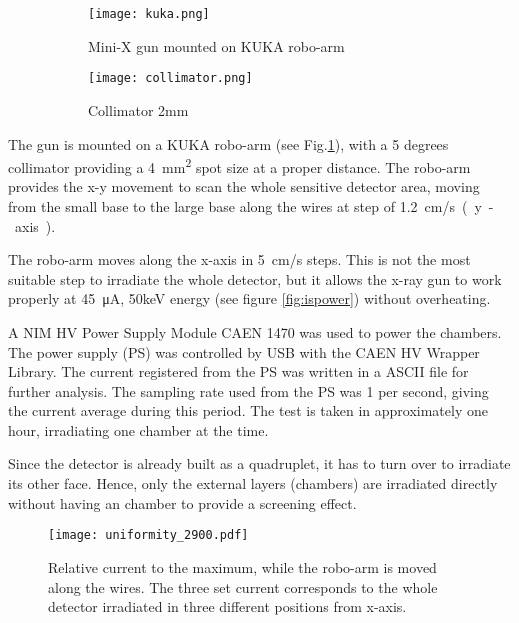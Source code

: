 \begin{figure}
	\centering
	\hspace*{\fill}
	{\begin{subfigure}[b]{0.4\textwidth}
	\centering
	\texttt{[image: kuka.png]}
	\caption{Mini-X gun mounted on KUKA robo-arm}\label{fig:kuka}
	\end{subfigure}
	}
	\hfill
	{
	\begin{subfigure}[b]{0.4\textwidth}
	\centering
	\texttt{[image: collimator.png]}
		\caption{Collimator 2mm}\label{fig:collimator}
	\end{subfigure}
	}
	\hspace*{\fill}
	\caption{}\label{}
\end{figure}

The gun is mounted on a KUKA robo-arm (see Fig.\ref{fig:kuka}), with a 5 degrees collimator providing a \SI{4}{mm^2}
spot size at a proper distance. The robo-arm provides the x-y movement to scan the whole sensitive detector area, moving
from the small base to the large base along the wires at step of \SI{1.2}{cm/s (y-axis)}.\par

The robo-arm moves along the x-axis in \SI{5}{cm/s} steps.  This is not the most suitable step to irradiate the whole
detector, but it allows the x-ray gun to work properly at \SI{45}{\micro A}, 50keV energy (see figure \ref{fig:ispower})
without overheating.\par

A NIM HV Power Supply Module CAEN 1470 was used to power the chambers. The power supply (PS) was controlled by USB with
the CAEN HV Wrapper Library. The current registered from the PS was written in a ASCII file for further analysis. The
sampling rate used from the PS was 1 per second, giving the current average during this period.  The test is taken in
approximately one hour, irradiating one chamber at the time.\par

Since the detector is already built as a quadruplet, it has to turn over to irradiate its other face. Hence, only
the external layers (chambers) are irradiated directly without having an chamber to provide a screening effect.\par

\begin{figure}[ht]
	\centering
		\hspace*{\fill}
	\texttt{[image: uniformity\_2900.pdf]}
		\hspace*{\fill}
	\caption{Relative current to the maximum, while the robo-arm is moved along the wires. The three set current
	corresponds to the whole detector irradiated in three different positions from x-axis.}\label{}
\end{figure}


